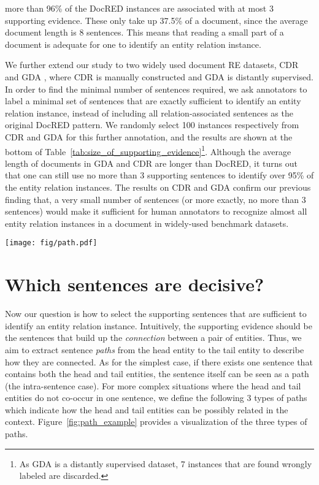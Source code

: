 \documentclass[11pt,a4paper]{article}
\begin{document}
more than 96\% of the DocRED instances are associated with at most 3 supporting evidence. These only take up 37.5\% of a document, since the average document length is 8 sentences.
This means that reading a small part of a document is adequate for one to identify an entity relation instance. 

We further extend our study to two widely used document RE datasets, CDR \cite{li2016biocreative} and GDA \cite{wu2019renet}, 
where CDR is manually constructed and GDA is distantly supervised.
In order to find the minimal number of sentences required, we ask annotators to label a minimal set of sentences that are exactly sufficient to identify an entity relation instance, instead of including all relation-associated sentences as the original DocRED pattern. We randomly select 100 instances respectively from CDR and GDA for this further annotation, and the results are shown at the bottom of Table~\ref{tab:size_of_supporting_evidence}\footnote{As GDA is a distantly supervised dataset, 7 instances that are found wrongly labeled are discarded.}. Although the average length of documents in GDA and CDR are longer than DocRED, it turns out that one can still use no more than 3 supporting sentences to identify over 95\% of the entity relation instances.  
The results on CDR and GDA confirm our previous finding that, a very small number of sentences (or more exactly, no more than 3 sentences) would make it sufficient for human annotators to recognize almost all entity relation instances in a document in widely-used benchmark datasets.

\begin{figure*}
    \centering
    \texttt{[image: fig/path.pdf]}
    \caption{Types of paths connecting head and tail entities. The rounded rectangles represent sentences and the circles are mentions of involved entities or other irrelevant tokens.  and  stands for a mention of head and tail entities respectively, and  represents a sentence.}
    \label{fig:path_example}
\end{figure*}

\section{Which sentences are decisive?}
\label{sec:decisive}


Now our question is how to select the supporting sentences  that are sufficient to identify an entity relation instance.
Intuitively, the supporting evidence should be the sentences that build up the \textit{connection} between a pair of entities. 
Thus, we aim to extract sentence \textit{paths} from the head entity to the tail entity to describe how they are connected. 
As for the simplest case, if there exists one sentence that contains both the head and tail entities, the sentence itself can be seen as a path (the intra-sentence case). For more complex situations where the head and tail entities do not co-occur in one sentence, we define the following 3 types of paths which indicate how the head and tail entities can be possibly related in the context. Figure~\ref{fig:path_example} provides a visualization of the three types of paths.
\end{document}
